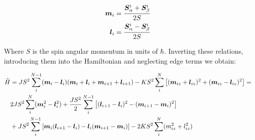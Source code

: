 \begin{align}
\boldsymbol{m}_i &= \frac{\boldsymbol{S}_{\alpha}^i + \boldsymbol{S}_{\beta}^i}{2S} \\
\boldsymbol{l}_i &= \frac{\boldsymbol{S}_{\alpha}^i - \boldsymbol{S}_{\beta}^i}{2S}
\end{align}

Where $S$ is the spin angular momentum in units of $\hbar$. Inverting these relations, introducing them into the Hamiltonian and neglecting edge terms we obtain:

\begin{align}
\hat{H} &= JS^2 \sum_i^{N-1} (\boldsymbol{m}_i-\boldsymbol{l}_i)(\boldsymbol{m}_i+\boldsymbol{l}_i+\boldsymbol{m}_{i+1}+\boldsymbol{l}_{i+1}) - KS^2\sum_i^N \left[(\boldsymbol{m}_{iz}+\boldsymbol{l}_{iz})^2 + (\boldsymbol{m}_{iz}-\boldsymbol{l}_{iz})^2 \right] \nonumber = \\
& 2JS^2\sum_i^{N} (\boldsymbol{m}_i^2-\boldsymbol{l}_i^2)+\frac{JS^2}{2}\sum_i^{N-1}\left[(\boldsymbol{l}_{i+1}-\boldsymbol{l}_i)^2-(\boldsymbol{m}_{i+1}-\boldsymbol{m}_i)^2 \right] \nonumber \\
& + JS^2\sum_i^{N-1} \left[ \boldsymbol{m}_i(\boldsymbol{l}_{i+1}-\boldsymbol{l}_i) - \boldsymbol{l}_i(\boldsymbol{m}_{i+1}-\boldsymbol{m}_i) \right] - 2KS^2\sum_i^N(m_{iz}^2+l_{iz}^2)
\end{align}
